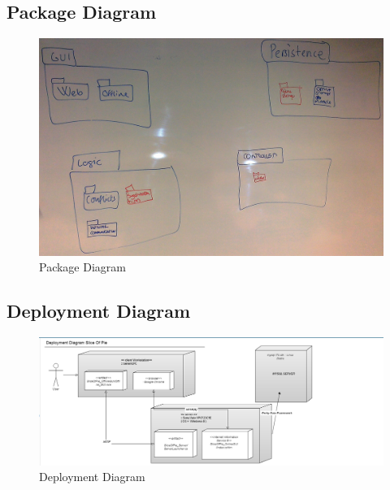 \subsection{Package Diagram}
\begin{figure}[H]
  \includegraphics[width=\textwidth,natwidth=2631,natheight=1660]{illustrations/PackageDiagram.jpg}
  \caption{Package Diagram}
  \label{packagediagram}
\end{figure}
\subsection{Deployment Diagram}
\begin{figure}[H]
  \includegraphics[width=\textwidth]{illustrations/deploymentDiagram.PNG}
  \caption{Deployment Diagram}
  \label{deploymentdiagram}
\end{figure}
